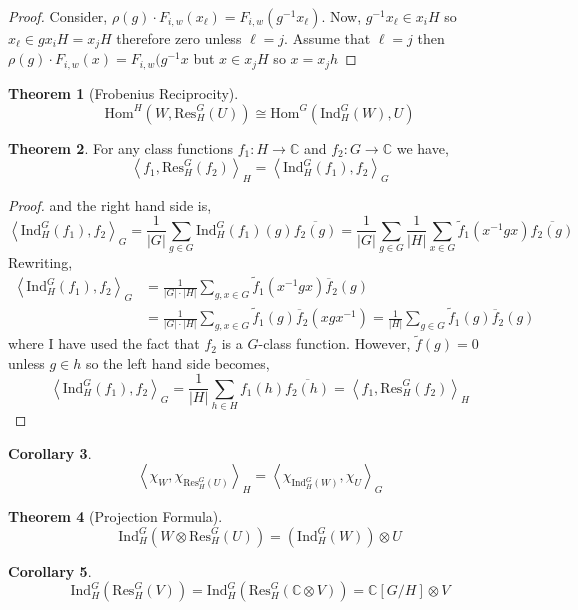 \documentclass[12pt]{extarticle}
\newcommand{\C}{\mathbb{C}}
\newcommand{\repHom}[3]{\mathrm{Hom}^{#1} \left( #2, #3 \right)}
\newcommand{\inner}[2]{\left<#1, #2 \right>}
\newcommand{\Ind}[3]{\mathrm{Ind}_{#2}^{#1}\left(#3\right)}
\newcommand{\Res}[3]{\mathrm{Res}_{#2}^{#1}\left(#3\right)}
\theoremstyle{definition}
\newtheorem{theorem}{Theorem}[section]
\newtheorem{corollary}[theorem]{Corollary}
\begin{document}
\begin{proof}
Consider, $\rho(g) \cdot F_{i, w}(x_\ell) = F_{i, w}(g^{-1} x_\ell)$. Now,
$g^{-1} x_\ell \in x_i H$ so $x_\ell \in g x_i H = x_j H$ therefore zero unless $\ell = j$. Assume that $\ell = j$ then $\rho(g) \cdot F_{i, w}(x) = F_{i, w}(g^{-1} x$ but $x \in x_j H$ so $x = x_j h$  
\end{proof}


\begin{theorem}[Frobenius Reciprocity]
\[ \repHom{H}{W}{\Res{G}{H}{U}} \cong \repHom{G}{\Ind{G}{H}{W}}{U} \]
\end{theorem}

\begin{theorem}
For any class functions $f_1 : H \to \C$ and $f_2 : G \to \C$ we have,
\[ \inner{f_1}{\Res{G}{H}{f_2}}_H = \inner{\Ind{G}{H}{f_1}}{f_2}_G \]
\end{theorem}

\begin{proof}
and the right hand side is,
\[ \inner{\Ind{G}{H}{f_1}}{f_2}_G = \frac{1}{|G|} \sum_{g \in G} \Ind{G}{H}{f_1}(g) \overline{f_2(g)} = \frac{1}{|G|} \sum_{g \in G} \frac{1}{|H|} \sum_{x \in G} \tilde{f}_1(x^{-1} g x) \overline{f_2(g)} \]
Rewriting,
\begin{align*}
\inner{\Ind{G}{H}{f_1}}{f_2}_G & = \frac{1}{|G| \cdot |H|} \sum_{g, x \in G} \tilde{f}_1(x^{-1} g x) \overline{f}_2(g)
\\
& = \frac{1}{|G| \cdot |H|} \sum_{g, x \in G} \tilde{f}_1(g) \overline{f}_2(x g x^{-1}) = \frac{1}{|H|} \sum_{g \in G} \tilde{f}_1(g) \overline{f}_2(g)
\end{align*}
where I have used the fact that $f_2$ is a $G$-class function. However, $\tilde{f}(g) = 0$  unless $g \in h$ so the left hand side becomes,
\[ \inner{\Ind{G}{H}{f_1}}{f_2}_G = \frac{1}{|H|} \sum_{h \in H} f_1(h) \overline{f_2(h)} = \inner{f_1}{\Res{G}{H}{f_2}}_H \]
\end{proof}

\begin{corollary}
\[ \inner{\chi_W}{\chi_{\Res{G}{H}{U}}}_H = \inner{\chi_{\Ind{G}{H}{W}}}{\chi_U}_G \]
\end{corollary}

\begin{theorem}[Projection Formula]
\[ \Ind{G}{H}{W \otimes \Res{G}{H}{U}} = (\Ind{G}{H}{W}) \otimes U \]
\end{theorem}

\begin{corollary}
\[ \Ind{G}{H}{\Res{G}{H}{V}} = \Ind{G}{H}{\Res{G}{H}{\C \otimes V}} = \C[G/H] \otimes V \]
\end{corollary}
\end{document}
